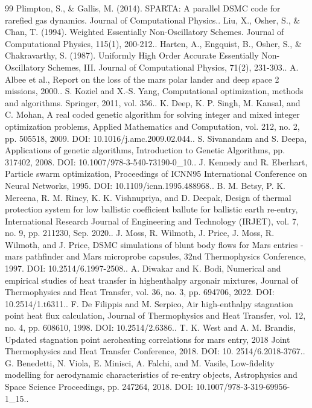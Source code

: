 \documentclass[conference]{IEEEtran}
\begin{document}
\begin{sloppypar}
\begin{thebibliography}{99}
 Plimpton, S., \& Gallis, M. (2014). SPARTA: A parallel DSMC code for rarefied gas dynamics. Journal of Computational Physics..
 Liu, X., Osher, S., \& Chan, T. (1994). Weighted Essentially Non-Oscillatory Schemes. Journal of Computational Physics, 115(1), 200-212..
 Harten, A., Engquist, B., Osher, S., \& Chakravarthy, S. (1987). Uniformly High Order Accurate Essentially Non-Oscillatory Schemes, III. Journal of Computational Physics, 71(2), 231-303..
 A. Albee et al., Report on the loss of the mars polar lander and deep space 2 missions, 2000..
 S. Koziel and X.-S. Yang, Computational optimization, methods and algorithms. Springer, 2011, vol. 356..
 K. Deep, K. P. Singh, M. Kansal, and C. Mohan, A real coded genetic algorithm for solving integer and mixed integer optimization problems, Applied Mathematics and Computation, vol. 212, no. 2, pp. 505518, 2009. DOI: 10.1016/j.amc.2009.02.044..
 S. Sivanandam and S. Deepa, Applications of genetic algorithms, Introduction to Genetic Algorithms, pp. 317402, 2008. DOI: 10.1007/978-3-540-73190-0\_10..
 J. Kennedy and R. Eberhart, Particle swarm optimization, Proceedings of ICNN95 International Conference on Neural Networks, 1995. DOI: 10.1109/icnn.1995.488968..
 B. M. Betsy, P. K. Mereena, R. M. Rincy, K. K. Vishnupriya, and D. Deepak, Design of thermal protection system for low ballistic coefficient ballute for ballistic earth re-entry, International Research Journal of Engineering and Technology (IRJET), vol. 7, no. 9, pp. 211230, Sep. 2020..
 J. Moss, R. Wilmoth, J. Price, J. Moss, R. Wilmoth, and J. Price, DSMC simulations of blunt body flows for Mars entries - mars pathfinder and Mars microprobe capsules, 32nd Thermophysics Conference, 1997. DOI: 10.2514/6.1997-2508..
 A. Diwakar and K. Bodi, Numerical and empirical studies of heat transfer in highenthalpy argonair mixtures, Journal of Thermophysics and Heat Transfer, vol. 36, no. 3, pp. 694706, 2022. DOI: 10.2514/1.t6311..
 F. De Filippis and M. Serpico, Air high-enthalpy stagnation point heat flux calculation, Journal of Thermophysics and Heat Transfer, vol. 12, no. 4, pp. 608610, 1998. DOI: 10.2514/2.6386..
 T. K. West and A. M. Brandis, Updated stagnation point aeroheating correlations for mars entry, 2018 Joint Thermophysics and Heat Transfer Conference, 2018. DOI: 10. 2514/6.2018-3767..
 G. Benedetti, N. Viola, E. Minisci, A. Falchi, and M. Vasile, Low-fidelity modelling for aerodynamic characteristics of re-entry objects, Astrophysics and Space Science Proceedings, pp. 247264, 2018. DOI: 10.1007/978-3-319-69956-1\_15..

\end{thebibliography}
\end{sloppypar}
\end{document}
